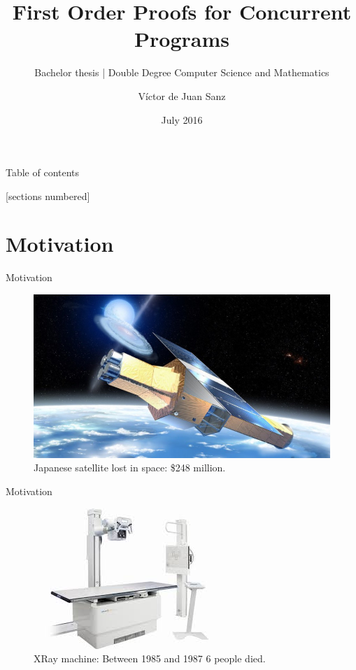 \documentclass[10pt,notes,compress,usetitleprogressbar,aspectratio=1610]{beamer}
\title{First Order Proofs for Concurrent Programs}
\subtitle{Bachelor thesis | Double Degree Computer Science and Mathematics}
\author{Víctor de Juan Sanz}
\date{July 2016}
\institute{Imdea Software}
\begin{document}
\begin{frame}
\end{frame}

\maketitle

\begin{frame}{Table of contents}
	\begin{center}
		[sections numbered]
		\tableofcontents[hideallsubsections]
	\end{center}
\end{frame}


\section{Motivation}

\begin{frame}{Motivation}
	\begin{figure}
		\centering
		\includegraphics[scale=0.4]{imgs/japanesse.jpg}
		\caption{Japanese satellite lost in space: \$248 million.}
	\end{figure}
\end{frame}

\begin{frame}{Motivation}
	\begin{figure}
		\includegraphics[scale=0.9]{imgs/xray.jpg}
		\caption{XRay machine: Between 1985 and 1987 6 people died.}
	\end{figure}
\end{frame}
\end{document}
